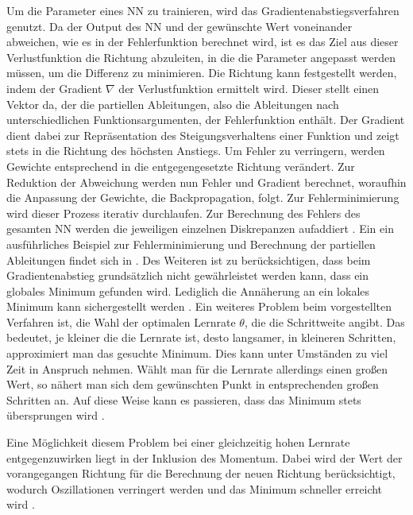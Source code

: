 \documentclass[12pt,a4paper]{article}
\begin{document}
Um die Parameter eines NN zu trainieren, wird das Gradientenabstiegsverfahren genutzt. Da der Output des NN und der gewünschte Wert voneinander abweichen, wie es in der Fehlerfunktion berechnet wird, ist es das Ziel aus dieser Verlustfunktion die Richtung abzuleiten, in die die Parameter angepasst werden müssen, um die Differenz zu minimieren. Die Richtung kann festgestellt werden, indem der Gradient $ \nabla $ der Verlustfunktion ermittelt wird. Dieser stellt einen Vektor da, der die partiellen Ableitungen, also die Ableitungen nach unterschiedlichen Funktionsargumenten, der Fehlerfunktion enthält. Der Gradient dient dabei zur Repräsentation des Steigungsverhaltens einer Funktion und zeigt stets in die Richtung des höchsten Anstiegs. Um Fehler zu verringern, werden Gewichte entsprechend in die entgegengesetzte Richtung verändert. Zur Reduktion der Abweichung werden nun Fehler und Gradient berechnet, woraufhin die Anpassung der Gewichte, die Backpropagation, folgt. Zur Fehlerminimierung wird dieser Prozess iterativ durchlaufen. Zur Berechnung des Fehlers des gesamten NN werden die jeweiligen einzelnen Diskrepanzen aufaddiert \cite[S. 58-60]{Kruse2015}. Ein ein ausführliches Beispiel zur Fehlerminimierung und Berechnung der partiellen Ableitungen findet sich in \cite[S. 64-68]{Kruse2015}.
Des Weiteren ist zu berücksichtigen, dass beim Gradientenabstieg grundsätzlich nicht gewährleistet werden kann, dass ein globales Minimum gefunden wird. Lediglich die Annäherung an ein lokales Minimum kann sichergestellt werden \cite[S. 69]{Kruse2015}. Ein weiteres Problem beim vorgestellten Verfahren ist, die Wahl der optimalen Lernrate $ \theta $, die die Schrittweite angibt. Das bedeutet, je kleiner die die Lernrate ist, desto langsamer, in kleineren Schritten, approximiert man das gesuchte Minimum. Dies kann unter Umständen zu viel Zeit in Anspruch nehmen. Wählt man für die Lernrate allerdings einen großen Wert, so nähert man sich dem gewünschten Punkt in entsprechenden großen Schritten an. Auf diese Weise kann es passieren, dass das Minimum stets übersprungen wird \cite[S. 67]{Kruse2015}. 

Eine Möglichkeit diesem Problem bei einer gleichzeitig hohen Lernrate entgegenzuwirken liegt in der Inklusion des Momentum. Dabei wird der Wert der vorangegangen Richtung für die Berechnung der neuen Richtung berücksichtigt, wodurch Oszillationen verringert werden und das Minimum schneller erreicht wird \cite{Rumelhart1985}.
\end{document}
